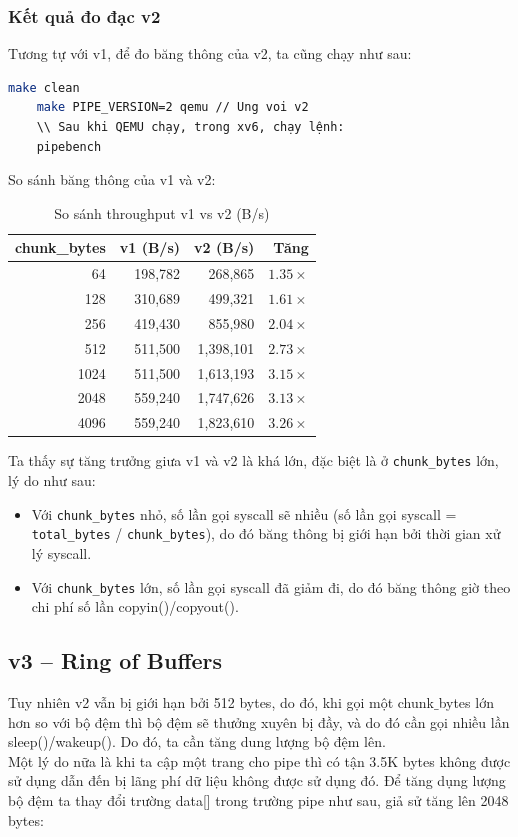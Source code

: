 \documentclass[12pt,a4paper]{article}
\newcommand{\code}[1]{\texttt{#1}}
\begin{document}
\subsubsection{Kết quả đo đạc v2}
Tương tự với v1, để đo băng thông của v2, ta cũng chạy như sau:
\begin{lstlisting}[language=bash]
    make clean
    make PIPE_VERSION=2 qemu // Ung voi v2
    \\ Sau khi QEMU chạy, trong xv6, chạy lệnh:
    pipebench
\end{lstlisting}
So sánh băng thông của v1 và v2:
\begin{table}[H]
\centering
\caption{So sánh throughput v1 vs v2 (B/s)}
\begin{tabular}{rrrr}
\toprule
\textbf{chunk\_bytes} & \textbf{v1 (B/s)} & \textbf{v2 (B/s)} & \textbf{Tăng} \\
\midrule
64   & 198,782 & 268,865   & $1.35\times$ \\
128  & 310,689 & 499,321   & $1.61\times$ \\
256  & 419,430 & 855,980   & $2.04\times$ \\
512  & 511,500 & 1,398,101 & $2.73\times$ \\
1024 & 511,500 & 1,613,193 & $3.15\times$ \\
2048 & 559,240 & 1,747,626 & $3.13\times$ \\
4096 & 559,240 & 1,823,610 & $3.26\times$ \\
\bottomrule
\end{tabular}
\end{table}
Ta thấy sự tăng trưởng giưa v1 và v2 là khá lớn, đặc biệt là ở \code{chunk\_bytes} lớn, lý do như sau:
\begin{itemize}
    \item Với \code{chunk\_bytes} nhỏ, số lần gọi syscall sẽ nhiều (số lần gọi syscall = \code{total\_bytes} / \code{chunk\_bytes}), do đó băng thông bị giới hạn bởi thời gian xử lý syscall.
    \item Với \code{chunk\_bytes} lớn, số lần gọi syscall đã giảm đi, do đó băng thông giờ theo chi phí số lần copyin()/copyout().
\end{itemize}
\subsection{v3 -- Ring of Buffers}
Tuy nhiên v2 vẫn bị giới hạn bởi 512 bytes, do đó, khi gọi một chunk$\_$bytes lớn hơn so với bộ đệm thì bộ đệm sẽ 
thưởng xuyên bị đầy, và do đó cần gọi nhiều lần sleep()/wakeup(). Do đó, ta cần tăng dung lượng bộ đệm lên. \\
Một lý do nữa là khi ta cập một trang cho pipe thì có tận 3.5K bytes không được sử dụng dẫn đến bị lãng phí dữ liệu không được sử dụng đó.
Để tăng dụng lượng bộ đệm ta thay đổi trường data[] trong trường pipe như sau, giả sử tăng lên 2048 bytes:
\end{document}
